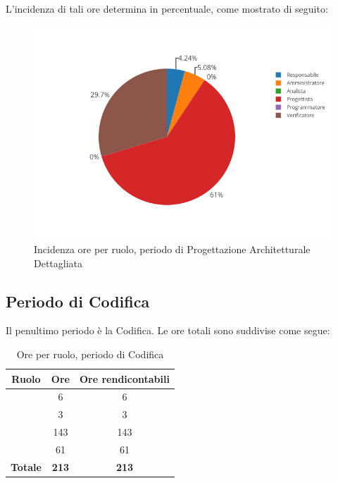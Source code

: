 L'incidenza di tali ore determina in percentuale, come mostrato di seguito:
\begin{figure}[H]
	\centering
	\includegraphics[scale=0.6]{img/ProgettazioneDettaglio.png}
	\caption{Incidenza ore per ruolo, periodo di Progettazione Architetturale Dettagliata}
\end{figure}

\newpage
\subsection{Periodo di Codifica}
Il penultimo periodo è la Codifica. Le ore totali sono suddivise come segue:

\begin{table}[H]
	\begin{center}
		\begin{tabular}{|c|c|c|}
			\hline
			\textbf{Ruolo}	& \textbf{Ore}	& \textbf{Ore rendicontabili} \\
			\hline
			\Res	&	6	&	6	\\
			\hline
			\Amm	&	3	&	3	\\
			\hline
			\Progr   &	143   &	143	\\
			\hline
			\Ver	&	61	&	61	\\
			\hline
			\textbf{Totale} & \textbf{213} & \textbf{213} \\
			\hline
		\end{tabular}
	\end{center}
	\caption{Ore per ruolo, periodo di Codifica}
\end{table}

